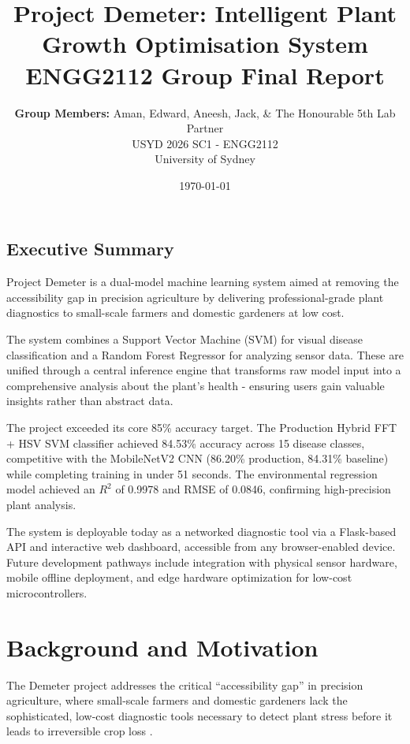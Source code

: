 \documentclass[11pt,a4paper]{article}
\title{\textbf{Project Demeter: Intelligent Plant Growth Optimisation System} \\ \large ENGG2112 Group Final Report}
\author{\textbf{Group Members:} Aman, Edward, Aneesh, Jack, \& The Honourable 5th Lab Partner \\
\large USYD 2026 SC1 - ENGG2112 \\
\large University of Sydney}
\date{\today}
\begin{document}
\maketitle

\begin{center}
    \subsection*{Executive Summary}
\end{center}
	
\noindent Project Demeter is a dual-model machine learning system aimed at removing the accessibility gap in precision agriculture by delivering professional-grade plant diagnostics to small-scale farmers and domestic gardeners at low cost. 

The system combines a Support Vector Machine (SVM) for visual disease classification and a Random Forest Regressor for analyzing sensor data. These are unified through a central inference engine that transforms raw model input into a comprehensive analysis about the plant's health - ensuring users gain valuable insights rather than abstract data.

The project exceeded its core 85\% accuracy target. The Production Hybrid FFT + HSV SVM classifier achieved 84.53\% accuracy across 15 disease classes, competitive with the MobileNetV2 CNN (86.20\% production, 84.31\% baseline) while completing training in under 51 seconds. The environmental regression model achieved an $R^2$ of 0.9978 and RMSE of 0.0846, confirming high-precision plant analysis.

The system is deployable today as a networked diagnostic tool via a Flask-based API and interactive web dashboard, accessible from any browser-enabled device. Future development pathways include integration with physical sensor hardware, mobile offline deployment, and edge hardware optimization for low-cost microcontrollers. 

\newpage

\tableofcontents
{}
\newpage
\setcounter{page}{1}
	
\section{Background and Motivation}\label{sec:intro}
The Demeter project addresses the critical ``accessibility gap'' in precision agriculture, where small-scale farmers and domestic gardeners lack the sophisticated, low-cost diagnostic tools necessary to detect plant stress before it leads to irreversible crop loss \cite{padhiary2024}. 
\end{document}
